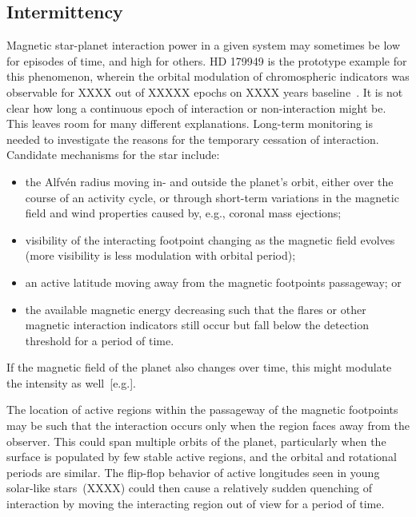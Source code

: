 \documentclass[twocolumn]{aastex631}
\begin{document}
\subsection{Intermittency}
\label{sec:discussion:intermittency}
Magnetic star-planet interaction power in a given system may sometimes be low for episodes of time, and high for others. HD 179949 is the prototype example for this phenomenon, wherein the orbital modulation of chromospheric indicators was observable for XXXX out of XXXXX epochs on XXXX years baseline~\citep{shkolnik2003evidence,shkolnik2008nature}. It is not clear how long a continuous epoch of interaction or non-interaction might be. This leaves room for many different explanations. Long-term monitoring is needed to investigate the reasons for the temporary cessation of interaction. Candidate mechanisms for the star include: 
\begin{itemize}
    \item the Alfv\'en radius moving in- and outside the planet's orbit, either over the course of an activity cycle, or through short-term variations in the magnetic field and wind properties caused by, e.g., coronal mass ejections;
    \item visibility of the interacting footpoint changing as the magnetic field evolves (more visibility is less modulation with orbital period);
    \item an active latitude moving away from the magnetic footpoints passageway; or
    \item the available magnetic energy decreasing such that the flares or other magnetic interaction indicators still occur but fall below the detection threshold for a period of time.
\end{itemize}

If the magnetic field of the planet also changes over time, this might modulate the intensity as well~[e.g.]\citep{turnpenney2018exoplanetinduced}.

The location of active regions within the passageway of the magnetic footpoints may be such that the interaction occurs only when the region faces away from the observer. This could span multiple orbits of the planet, particularly when the surface is populated by few stable active regions, and the orbital and rotational periods are similar. The flip-flop behavior of active longitudes seen in young solar-like stars~(XXXX) could then cause a relatively sudden quenching of interaction by moving the interacting region out of view for a period of time. 
\end{document}
